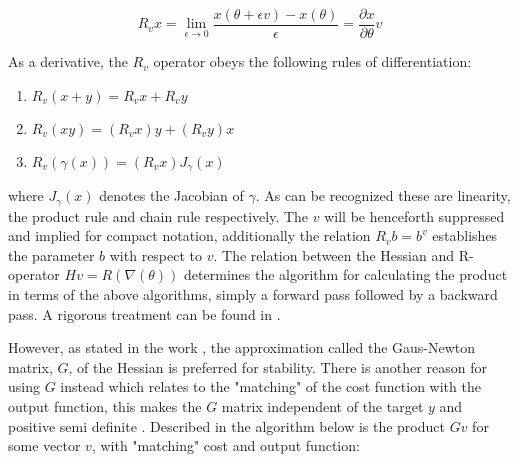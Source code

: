 \[R_vx = \lim_{\epsilon\to 0} \frac{x(\theta + \epsilon v) - x(\theta)}{\epsilon} = \frac{\partial x}{\partial\theta}v\]

As a derivative, the $R_v$ operator obeys the following rules of differentiation:

\begin{enumerate}
    \item $R_v(x+y) = R_vx + R_vy$
    \item $ R_v(xy) = (R_vx)y + (R_vy)x $
    \item $R_v(\gamma(x)) = (R_vx) J_{\gamma}(x)$
\end{enumerate}

where $J_\gamma(x)$ denotes the Jacobian of $\gamma$. As can be recognized these are linearity, the product rule and chain rule respectively. The $v$ will be henceforth suppressed and implied for compact notation, additionally the relation $R_vb = b^v$ establishes the parameter $b$ with respect to $v$. The relation between the Hessian and R-operator $Hv = R(\nabla(\theta))$ determines the algorithm for calculating the product in terms of the above algorithms, simply a forward pass followed by a backward pass. A rigorous treatment can be found in \cite{suts}.

However, as stated in the work \cite{suts}, the approximation called the Gaus-Newton matrix, \(G\), of the Hessian is preferred for stability. There is another reason for using $G$ instead which relates to the "matching" of the cost function with the output function, this makes the $G$ matrix independent of the target $y$ and positive semi definite \cite{Martens2012}. Described in the algorithm below is the product \(Gv\) for some vector $v$, with "matching" cost and output function:

\begin{algorithmic}[1]
    \EndFor
    \EndFor
    \State {}
\end{algorithmic}

